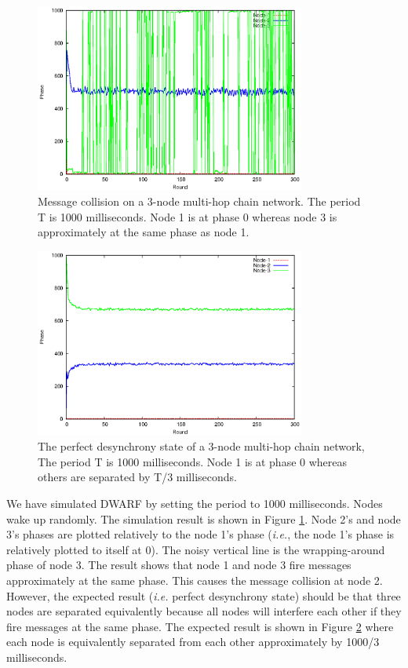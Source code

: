 \begin{figure}[!t]
\centering
\includegraphics[width=3.5in]{figure/3nodes-chain-dwarf}
\caption{Message collision on a 3-node multi-hop chain network. The period T is 1000 milliseconds. Node 1 is at phase 0 whereas node 3 is approximately at the same phase as node 1.}
\label{fig:3nodes-chain-dwarf}
\end{figure}

\begin{figure}[!t]
\centering
\includegraphics[width=3.5in]{figure/3nodes-chain-expected}
\caption{The perfect desynchrony state of a 3-node multi-hop chain network, The period T is 1000 milliseconds. Node 1 is at phase 0 whereas others are separated by T/3 milliseconds.}
\label{fig:3nodes-chain-expected}
\end{figure}

We have simulated DWARF by setting the period to 1000 milliseconds. Nodes wake up randomly. 
The simulation result is shown in Figure \ref{fig:3nodes-chain-dwarf}. Node 2's and node 3's phases are plotted relatively to the node 1's phase (\textit{i.e.}, the node 1's phase is relatively plotted to itself at 0). The noisy vertical line is the wrapping-around phase of node 3. The result shows that node 1 and node 3 fire messages approximately at the same phase. This causes the message collision at node 2.
However, the expected result (\textit{i.e.} perfect desynchrony state) should be that three nodes are separated equivalently because all nodes will interfere each other if they fire messages at the same phase. The expected result is shown in Figure \ref{fig:3nodes-chain-expected} where each node is equivalently separated from each other approximately by 1000/3 milliseconds.

